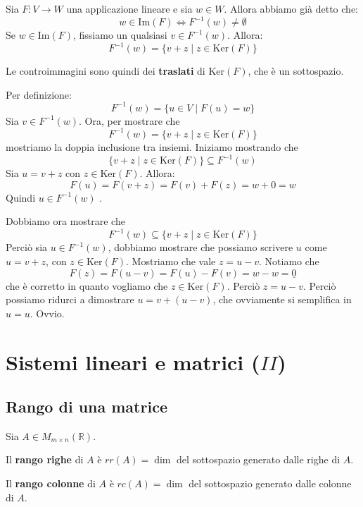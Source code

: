 \documentclass[
  a4paper,
]{article}
\begin{document}
\begin{teoremabox}
Sia \(F : V \to W\) una applicazione lineare e sia \(w \in W\). Allora
abbiamo già detto che: \[
w \in \text{Im}(F) \iff F^{-1}(w) \not = \emptyset
\] Se \(w \in \text{Im}(F)\), fissiamo un qualsiasi \(v \in F^{-1}(w)\).
Allora: \[
F^{-1}(w) = \{v + z \mid z \in \text{Ker}(F) \}
\]
\end{teoremabox}

Le controimmagini sono quindi dei \textbf{traslati} di
\(\text{Ker}(F)\), che è un sottospazio.

\begin{proofbox}
Per definizione: \[
F^{-1}(w) = \{u \in V \mid F(u) = w\}
\] Sia \(v \in F^{-1}(w)\). Ora, per mostrare che \[
F^{-1}(w) = \{v + z \mid z \in \text{Ker}(F) \}
\] mostriamo la doppia inclusione tra insiemi. Iniziamo mostrando che \[
\{v + z \mid z \in \text{Ker}(F) \} \subseteq F^{-1}(w) 
\] Sia \(u = v + z\) con \(z \in \text{Ker}(F)\). Allora: \[
F(u) = F(v + z) = F(v) + F(z) = w + 0 = w
\] Quindi \(u \in F^{-1}(w)\) .

Dobbiamo ora mostrare che \[
F^{-1}(w) \subseteq \{v + z \mid z \in \text{Ker}(F) \}
\] Perciò sia \(u \in F^{-1}(w)\), dobbiamo mostrare che possiamo
scrivere \(u\) come \(u = v + z\), con \(z \in \text{Ker}(F)\).
Mostriamo che vale \(z = u - v\). Notiamo che \[
F(z) = F(u - v) = F(u) - F(v) = w - w = \underline{0}
\] che è corretto in quanto vogliamo che \(z \in \text{Ker}(F)\). Perciò
\(z = u - v\). Perciò possiamo ridurci a dimostrare \(u = v + (u - v)\),
che ovviamente si semplifica in \(u = u\). Ovvio.
\end{proofbox}

\newpage

\hypertarget{sistemi-lineari-e-matrici-ii}{%
\section{\texorpdfstring{Sistemi lineari e matrici
(\(II\))}{Sistemi lineari e matrici (II)}}\label{sistemi-lineari-e-matrici-ii}}

\hypertarget{rango-di-una-matrice}{%
\subsection{Rango di una matrice}\label{rango-di-una-matrice}}

\begin{definitionbox}
Sia \(A \in M_{m \times n}(\mathbb{R})\).

Il \textbf{rango righe} di \(A\) è \(rr(A) =\dim\) del sottospazio
generato dalle righe di \(A\).

Il \textbf{rango colonne} di \(A\) è \(rc(A) = \dim\) del sottospazio
generato dalle colonne di \(A\).
\end{definitionbox}
\end{document}
